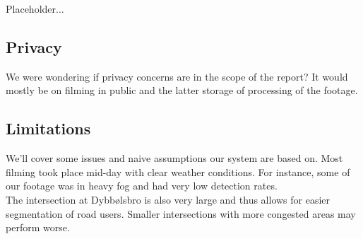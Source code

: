Placeholder...

\subsection{Privacy}
We were wondering if privacy concerns are in the scope of the report? 
It would mostly be on filming in public and the latter storage of processing of the footage.

\subsection{Limitations}
We'll cover some issues and naive assumptions our system are based on. Most filming took place
mid-day with clear weather conditions. For instance, some of our footage was in heavy fog and had
 very low detection rates.
\ \\
The intersection at Dybbølsbro is also very large and thus allows for easier segmentation of road users. 
Smaller intersections with more congested areas may perform worse. 
